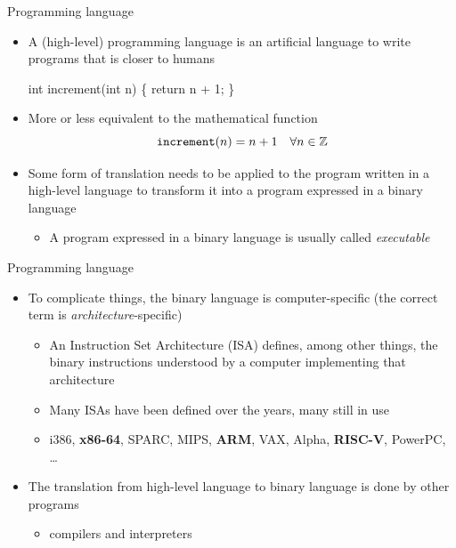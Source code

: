 \begin{frame}[fragile]{Programming language}
  \begin{itemize}
  \item<1-> A (high-level) programming language is an artificial language to write
    programs that is closer to humans
    \begin{codeblock}
int increment(int n)
\{
  return n + 1;
\}\end{codeblock}        
  \item<1-> More or less equivalent to the mathematical function
  \[
    \verb|increment|(n) = n + 1 \quad \forall n \in \mathbb{Z}
  \]

  \item<2-> Some form of translation needs to be applied to the program written in a
    high-level language to transform it into a program expressed in a binary
    language
    \begin{itemize}
    \item A program expressed in a binary language is usually called \textit{executable}
    \end{itemize}
  \end{itemize}

\end{frame}
\begin{frame}[fragile]{Programming language \insertcontinuationtext}
  \begin{itemize}
  \item<1-> To complicate things, the binary language is computer-specific (the
    correct term is \textit{architecture}-specific)
    \begin{itemize}[<.->]
    \item An Instruction Set Architecture (ISA) defines, among other things, the
      binary instructions understood by a computer implementing that
      architecture
    \item Many ISAs have been defined over the years, many still in use
    \item i386, \textbf{x86-64}, SPARC, MIPS, \textbf{ARM}, VAX, Alpha, \textbf{RISC-V},
      PowerPC, \ldots
    \end{itemize}
  \item<2-> The translation from high-level language to binary language is done
    by other programs
    \begin{itemize}[<.->]
    \item \alert{compilers} and interpreters
    \end{itemize}
  \end{itemize}

\end{frame}


